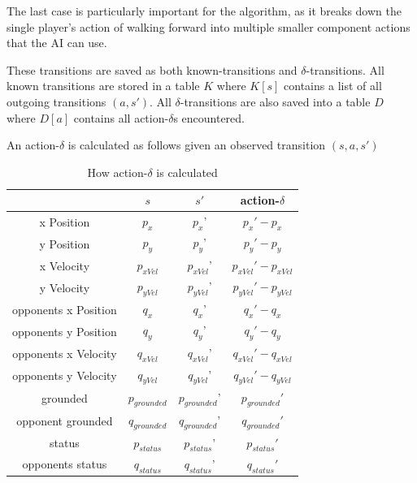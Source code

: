 The last case is particularly important for the algorithm, as it breaks down the single player's action of walking forward into multiple smaller component actions that the AI can use.

These transitions are saved as both known-transitions and $\delta$-transitions. All known transitions are stored in a table $K$ where $K[s]$ contains a list of all outgoing transitions $(a,s')$. All $\delta$-transitions are also saved into a table $D$ where $D[a]$ contains all action-$\delta$s encountered. 

An action-$\delta$ is calculated as follows given an observed transition $(s, a, s')$

\begin{table}[h]
	\centering
	\caption{How action-$\delta$ is calculated}
	\begin{tabular}{| c | c | c | c |}
		\hline
		 & $s$ & $s'$ & action-$\delta$ \\
		\hline
		x Position        			& $p_{x}$ & $p_{x}$' & $p_{x}' - p_{x}$ 	\\
		\hline            			
		y Position        			& $p_{y}$ & $p_{y}$' & $p_{y}' - p_{y}$ 	\\
		\hline            			
		x Velocity        			& $p_{xVel}$ & $p_{xVel}$' & $p_{xVel}' - p_{xVel}$  \\
		\hline            			
		y Velocity        			& $p_{yVel}$ & $p_{yVel}$' & $p_{yVel}' - p_{yVel}$	\\
		\hline
		opponents x Position        & $q_{x}$ & $q_{x}$' & $q_{x}' - q_{x}$	\\
		\hline
		opponents y Position        & $q_{y}$ & $q_{y}$' & $q_{y}' - q_{y}$ \\
		\hline
		opponents x Velocity        & $q_{xVel}$& $q_{xVel}$' & $q_{xVel}' - q_{xVel}$	\\
		\hline
		opponents y Velocity        & $q_{yVel}$ & $q_{yVel}$' & $q_{yVel}' - q_{yVel}$	\\
		\hline
		grounded        			& $p_{grounded}$ & $p_{grounded}$' & $p_{grounded}'$	\\
		\hline
		opponent grounded       	& $q_{grounded}$ & $q_{grounded}$' & $q_{grounded}'$ 	\\
		\hline
		status       				& $p_{status}$ & $p_{status}$' & $p_{status}'$ 	\\
		\hline
		opponents status        	& $q_{status}$ & $q_{status}$' & $q_{status}'$ 	\\
		\hline
	\end{tabular}
	\label{gamestate}
\end{table}

